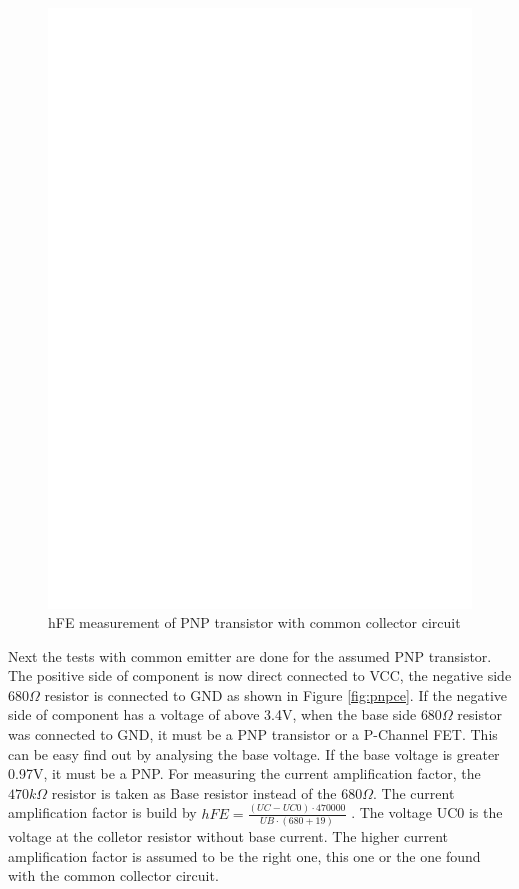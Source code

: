 \begin{figure}[H]
\centering
\includegraphics[]{../FIG/PNPcc.eps}
\caption{hFE measurement of PNP transistor with common collector circuit }
\label{fig:pnpcc}
\end{figure}

Next the tests with common emitter are done for the assumed PNP transistor.
The positive side of component is now direct connected to VCC, the negative side \(680\Omega\) resistor
is connected to GND as shown in Figure \ref{fig:pnpce}. 
If the negative side of component has a voltage of above 3.4V, when the base side \(680\Omega\) resistor 
was connected to GND, it must be a PNP transistor or a P-Channel FET. This can be easy find out by
analysing the base voltage. If the base voltage is greater 0.97V, it must be a PNP.
For measuring the current amplification factor, the \(470k\Omega\) resistor is taken as Base resistor
instead of the \(680\Omega\).
The current amplification factor is build by \(hFE = \frac{(UC-UC0) \cdot 470000}{UB \cdot (680+19)}\) .
The voltage UC0 is the voltage at the colletor resistor without base current.
The higher current amplification factor is assumed to be the right one, this one or the one found with
the common collector circuit.


